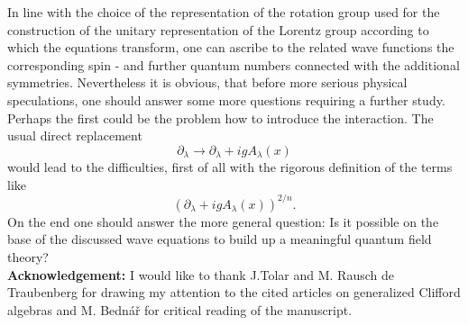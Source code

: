 \documentclass[a4paper,a4paper]{article}
\begin{document}
In line with the choice of the representation of the rotation group used for
the construction of the unitary representation of the Lorentz group
according to which the equations transform, one can ascribe to the related
wave functions the corresponding spin - and further quantum numbers
connected with the additional symmetries. Nevertheless it is obvious, that
before more serious physical speculations, one should answer some more
questions requiring a further study. Perhaps the first could be the problem
how to introduce the interaction. The usual direct replacement%
\begin{equation*}
\partial _{\lambda }\rightarrow \partial _{\lambda }+igA_{\lambda }(x)
\end{equation*}%
would lead to the difficulties, first of all with the rigorous definition of
the terms like%
\begin{equation*}
\left( \partial _{\lambda }+igA_{\lambda }(x)\right) ^{2/n}.
\end{equation*}%
On the end one should answer the more general question: Is it possible on
the base of the discussed wave equations to build up a meaningful quantum
field theory? \ \\[5mm]
\noindent \textbf{Acknowledgement:} I would like to thank J.Tolar and M.
Rausch de Traubenberg for drawing my attention to the cited articles on
generalized Clifford algebras and M. Bedn\'{a}\v{r} for critical reading of
the manuscript.
\end{document}

